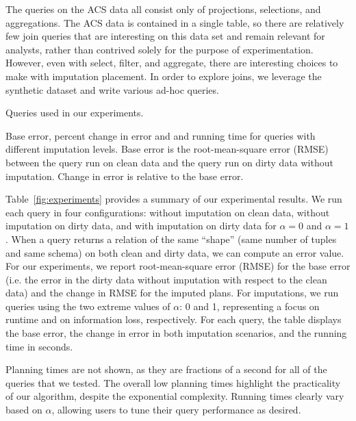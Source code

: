 The queries on the ACS data all consist only of projections, selections, and aggregations.
The ACS data is contained in a single table, so there are relatively few join queries that are interesting on this data set and remain relevant for analysts, rather
than contrived solely for the purpose of experimentation.
However, even with select, filter, and aggregate, there are interesting choices to make with imputation placement. In order to explore joins, we leverage the synthetic
dataset and write various ad-hoc queries.

\begin{table}
  \centerfloat
  
  \caption{Queries used in our experiments.}
  \label{fig:queries}
\end{table}

\begin{table}
  \centerfloat
  
    \caption{Base error, percent change in error and and running time for queries
    with different imputation levels. Base error is the root-mean-square error (RMSE) between the query run on clean
    data and the query run on dirty data without imputation. Change in error is relative to the base error.}
  \label{fig:experiments}
\end{table}

Table~\ref{fig:experiments} provides a summary of our experimental results.
We run each query in four configurations: without imputation on clean data, without imputation on dirty data, and with imputation on dirty data for $\alpha = 0$ and $\alpha = 1$.
When a query returns a relation of the same ``shape'' (same number of tuples and same schema) on both clean and dirty data, we can compute an error value.
For our experiments, we report root-mean-square error (RMSE) for the base error (i.e. the error in the dirty data without imputation with respect to the clean data) and the change
in RMSE for the imputed plans.
For imputations, we run queries using the two extreme values of $\alpha$: 0 and 1, representing a focus on runtime and on information loss, respectively.
For each query, the table displays the base error, the change in error in both imputation scenarios, and the running time in seconds.

Planning times are not shown, as they are fractions of a second for all of the queries that we tested.
The overall low planning times highlight the practicality of our algorithm, despite the exponential complexity.
Running times clearly vary based on $\alpha$, allowing users to tune their query performance as desired.

